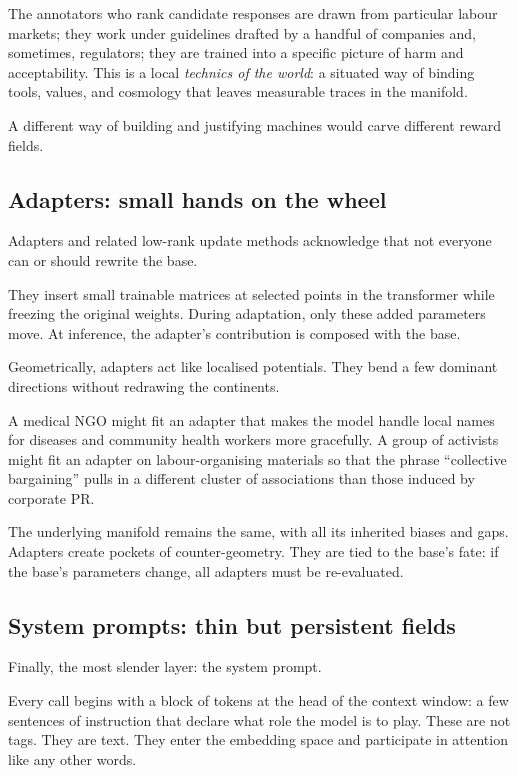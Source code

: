 \documentclass[12pt,a4paper]{book}
\begin{document}
The annotators who rank candidate responses are drawn from particular labour markets; they work under guidelines drafted by a handful of companies and, sometimes, regulators; they are trained into a specific picture of harm and acceptability. This is a local \emph{technics of the world}: a situated way of binding tools, values, and cosmology that leaves measurable traces in the manifold.

A different way of building and justifying machines would carve different reward fields.

\subsection*{Adapters: small hands on the wheel}

Adapters and related low-rank update methods acknowledge that not everyone can or should rewrite the base.

They insert small trainable matrices at selected points in the transformer while freezing the original weights. During adaptation, only these added parameters move. At inference, the adapter's contribution is composed with the base.

Geometrically, adapters act like localised potentials. They bend a few dominant directions without redrawing the continents.

A medical NGO might fit an adapter that makes the model handle local names for diseases and community health workers more gracefully. A group of activists might fit an adapter on labour-organising materials so that the phrase ``collective bargaining'' pulls in a different cluster of associations than those induced by corporate PR.

The underlying manifold remains the same, with all its inherited biases and gaps. Adapters create pockets of counter-geometry. They are tied to the base's fate: if the base's parameters change, all adapters must be re-evaluated.

\subsection*{System prompts: thin but persistent fields}

Finally, the most slender layer: the system prompt.

Every call begins with a block of tokens at the head of the context window: a few sentences of instruction that declare what role the model is to play. These are not tags. They are text. They enter the embedding space and participate in attention like any other words.
\end{document}
